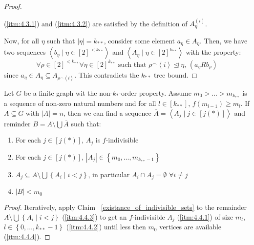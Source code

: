 \begin{proof}
\begin{itemize}
                (\ref{itm:4.3.1}) and (\ref{itm:4.3.2}) are satisfied by the definition of $A_\eta^{(i)}$.
        \end{itemize}
        Now, for all $\eta$ such that $|\eta| = k_{**}$, consider some element $a_\eta \in A_\eta$.
        Then, we have two sequences $\left< b_\eta \mid \eta \in [2]^{<k_{**}} \right>$ and $\left< A_\eta \mid \eta \in [2]^{k_{**}} \right>$
            with the property:
        \[
            \forall \rho \in [2]^{<k_{**}} \forall \eta \in [2]^{k_{**}} \text{ such that } \rho^\frown \left< i \right> \trianglelefteq
                \eta \text{, } (a_\eta R b_\rho)
        \]
            since $a_\eta \in A_\eta \subseteq A_{\rho ^\frown \left< i \right>}$.
        This contradicts the $k_{**}$ tree bound.
        \end{proof}

    \lemma[Claim 4.4]\label{existance_of_f_indivisible_partitions}
    Let $G$ be a finite graph wit the non-$k_{*}$-order property.
    Assume $m_0 > \dots > m_{k_{**}}$ is a sequence of non-zero natural numbers and for all $l \in [k_{**}]$, $f(m_{l-1}) \geq m_l$.
    If $A \subseteq G$ with $|A| = n$, then we can find a sequence $\overline{A} = \left< A_j \mid j \in [j(*)] \right>$
        and reminder $B = A \setminus \bigcup \overline{A}$ such that:
    \begin{enumerate}
        \item \label{itm:4.4.1} For each $j \in [j(*)]$, $A_j$ is $f$-indivisible
        \item \label{itm:4.4.2} For each $j \in [j(*)]$, $|A_j| \in \left\{ m_0, \dots, m_{k_{**}-1} \right\}$
        \item \label{itm:4.4.3} $A_j \subseteq A \setminus \bigcup\left\{ A_i \mid i < j \right\}$, in particular $A_i \cap A_j = \emptyset$ $\forall i \neq j$
        \item \label{itm:4.4.4} $|B| < m_0$
    \end{enumerate}
        \begin{proof}
        Iteratively, apply Claim ~\ref{existance_of_indivisible_sets} to the remainder $A \setminus \bigcup \left\{ A_i \mid i < j \right\}$
            (\ref{itm:4.4.3}) to get an $f$-indivisible $A_j$ (\ref{itm:4.4.1}) of size $m_l$, $l \in \left\{ 0, \dots, k_{**}-1 \right\}$
            (\ref{itm:4.4.2}) until less then $m_0$ vertices are available (\ref{itm:4.4.4}).
        \end{proof}

